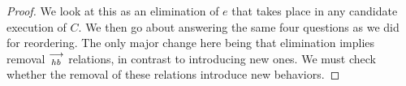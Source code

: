\begin{proof}
    We look at this as an elimination of $e$ that takes place in any candidate execution of $C$. 
    We then go about answering the same four questions as we did for reordering. 
    The only major change here being that elimination implies removal $\stackrel{\longrightarrow}{_{hb}}$ relations, in contrast to introducing new ones.
    We must check whether the removal of these relations introduce new behaviors.
    
    
    
    
    
    
\end{proof}